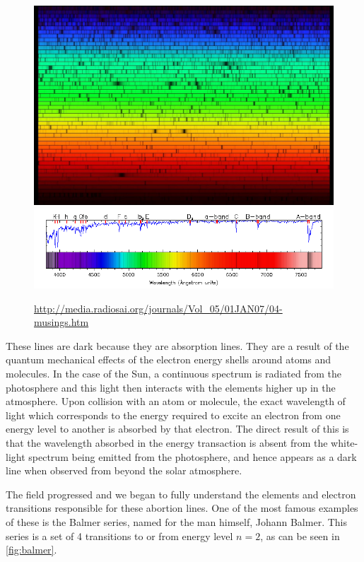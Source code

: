 \begin{figure}
	\centering
	\includegraphics[width=\linewidth]{Chapter1/Figs/sun_spectrum}
	\includegraphics[width=\linewidth]{Chapter1/Figs/fraunhofer_lines}
	\label{fig:fraunhofer}
	\caption{\url{http://media.radiosai.org/journals/Vol_05/01JAN07/04-musings.htm}}
\end{figure}


These lines are dark because they are absorption lines.
They are a result of the quantum mechanical effects of the electron energy shells around atoms and molecules.
In the case of the Sun, a continuous spectrum is radiated from the photosphere and this light then interacts with the elements higher up in the atmosphere.
Upon collision with an atom or molecule, the exact wavelength of light which corresponds to the energy required to excite an electron from one energy level to another is absorbed by that electron.
The direct result of this is that the wavelength absorbed in the energy transaction is absent from the white-light spectrum being emitted from the photosphere, and hence appears as a dark line when observed from beyond the solar atmosphere. 

The field progressed and we began to fully understand the elements and electron transitions responsible for these abortion lines.
One of the most famous examples of these is the Balmer series, named for the man himself, Johann Balmer.
This series is a set of 4 transitions to or from energy level $n = 2$, as can be seen in \ref{fig:balmer}.

